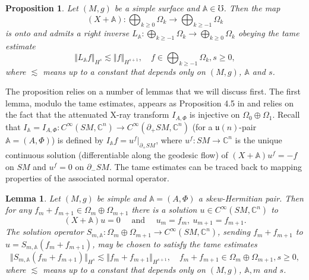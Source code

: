 \documentclass[JEP,XML,SOM,Unicode,published]{cedram}
\theoremstyle{plain}
\newtheorem{proposition}[theorem]{Proposition}
\newtheorem{lemma}[theorem]{Lemma}
\theoremstyle{definition}
\newcommand{\A}{\mathbb{A}}
\newcommand{\C}{\mathbb{C}}
\renewcommand{\u}{\mathfrak{u}}
\newcommand{\1}{{\bf 1}}
\begin{document}
\begin{proposition} \label{xaonto}
Let $(M,g)$ be a simple surface and $\A\in\mho$. Then the map
\[
(X+\A):\bigoplus_{k\ge 0}\Omega_k \to \bigoplus_{k\ge -1}\Omega_k
\]
is onto and admits a right inverse $L_\A:\bigoplus_{k\ge -1}\Omega_k \to \bigoplus_{k\ge 0}\Omega_k$ obeying the tame estimate
\begin{equation*}
\Vert L_\A f \Vert_{H^s} \lesssim \Vert f \Vert_{H^{s+1}},\quad f\in \bigoplus_{k\ge -1}\Omega_{k}, s\ge 0,
\end{equation*}
where $\lesssim$ means up to a constant that depends only on $(M,g)$, $\A$ and $s$.
\end{proposition}

The proposition relies on a number of lemmas that we will discuss first.
The first lemma, modulo the tame estimates, appears as Proposition 4.5 in \cite{AiAs15} and relies on the fact that the attenuated X-ray transform $I_{A,\Phi}$ is injective on $\Omega_0\oplus \Omega_1$. Recall that $I_\A=I_{A,\Phi}:C^\infty(SM,\C^n)\to C^\infty(\partial_+SM,\C^n)$ (for a $\u(n)$-pair $\A=(A,\Phi)$) is defined by $I_\A f = u^f\vert_{\partial_+ SM}$, where $u^f:SM\to \C^n$ is the unique continuous solution (differentiable along the geodesic flow) of $(X+\A)u^f=-f$ on $SM$ and $u^f=0$ on $\partial_-SM$.
The tame estimates can be traced back to mapping properties of the associated normal operator.

\begin{lemma} \label{lemA} Let $(M,g)$ be simple and $\A=(A,\Phi)$ a skew-Hermitian pair. Then for any $f_m+f_{m+1}\in \Omega_m\oplus \Omega_{m+1}$ there is a solution $u\in C^\infty(SM,\C^n)$ to
\begin{equation} \label{lemA1}
(X+\A)u = 0 \quad \text{ and } \quad u_m=f_m,~u_{m+1}=f_{m+1}.
\end{equation}
The solution operator $S_{m,\A}:\Omega_m\oplus \Omega_{m+1}\to C^\infty(SM,\C^n)$, sending $f_m+f_{m+1}$ to $u=S_{m,\A}(f_m+f_{m+1})$, may be chosen to satisfy the tame estimates
\begin{equation} \label{lemA2}
\Vert S_{m,\A}(f_{m}+f_{m+1}) \Vert_{H^s} \lesssim \Vert f_{m} + f_{m+1} \Vert_{H^{s+1}},\quad f_m+f_{m+1} \in \Omega_m\oplus \Omega_{m+1}, s\ge 0,
\end{equation}
where $\lesssim$ means up to a constant that depends only on $(M,g)$, $\A,m$ and $s$.
\end{lemma}
\end{document}
